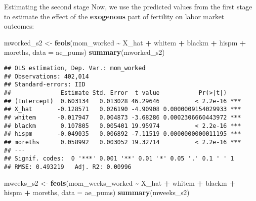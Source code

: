 \documentclass[
  ignorenonframetext,
]{beamer}
\newenvironment{Shaded}{\begin{snugshade}}{\end{snugshade}}
\newcommand{\AttributeTok}[1]{\textcolor[rgb]{0.13,0.29,0.53}{#1}}
\newcommand{\FunctionTok}[1]{\textcolor[rgb]{0.13,0.29,0.53}{\textbf{#1}}}
\newcommand{\NormalTok}[1]{#1}
\newcommand{\OtherTok}[1]{\textcolor[rgb]{0.56,0.35,0.01}{#1}}
\newcommand{\SpecialCharTok}[1]{\textcolor[rgb]{0.81,0.36,0.00}{\textbf{#1}}}
\begin{document}
\begin{frame}[fragile]{Estimating the second stage}
\label{estimating-the-second-stage}
Now, we use the predicted values from the first stage to estimate the
effect of the \textbf{exogenous} part of fertility on labor market
outcomes:

\tiny

\begin{Shaded}
\begin{Highlighting}[]
\NormalTok{mworked\_s2 }\OtherTok{\textless{}{-}} \FunctionTok{feols}\NormalTok{(mom\_worked }\SpecialCharTok{\textasciitilde{}}\NormalTok{ X\_hat }\SpecialCharTok{+}\NormalTok{ whitem }\SpecialCharTok{+}\NormalTok{ blackm }\SpecialCharTok{+}\NormalTok{ hispm }\SpecialCharTok{+}\NormalTok{ moreths, }
                     \AttributeTok{data =}\NormalTok{ ae\_pums)}
\FunctionTok{summary}\NormalTok{(mworked\_s2)}
\end{Highlighting}
\end{Shaded}

\begin{verbatim}
## OLS estimation, Dep. Var.: mom_worked
## Observations: 402,014
## Standard-errors: IID 
##              Estimate Std. Error  t value           Pr(>|t|)    
## (Intercept)  0.603134   0.013028 46.29646          < 2.2e-16 ***
## X_hat       -0.128571   0.026190 -4.90908 0.0000009154029933 ***
## whitem      -0.017947   0.004873 -3.68286 0.0002306660443972 ***
## blackm       0.107805   0.005401 19.95974          < 2.2e-16 ***
## hispm       -0.049035   0.006892 -7.11519 0.0000000000011195 ***
## moreths      0.058992   0.003052 19.32714          < 2.2e-16 ***
## ---
## Signif. codes:  0 '***' 0.001 '**' 0.01 '*' 0.05 '.' 0.1 ' ' 1
## RMSE: 0.493219   Adj. R2: 0.00996
\end{verbatim}

\tiny

\begin{Shaded}
\begin{Highlighting}[]
\NormalTok{mweeks\_s2 }\OtherTok{\textless{}{-}} \FunctionTok{feols}\NormalTok{(mom\_weeks\_worked }\SpecialCharTok{\textasciitilde{}}\NormalTok{ X\_hat }\SpecialCharTok{+}\NormalTok{ whitem }\SpecialCharTok{+}\NormalTok{ blackm }\SpecialCharTok{+}\NormalTok{ hispm }\SpecialCharTok{+}\NormalTok{ moreths, }
                     \AttributeTok{data =}\NormalTok{ ae\_pums)}
\FunctionTok{summary}\NormalTok{(mweeks\_s2)}
\end{Highlighting}
\end{Shaded}


\end{frame}
\end{document}
